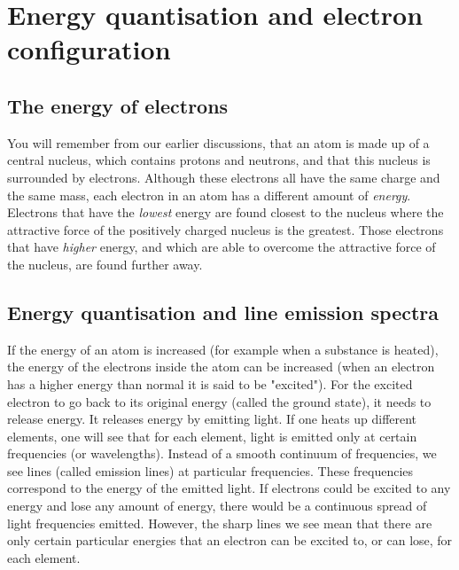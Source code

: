 



\section{Energy quantisation and electron configuration}
\label{sec:atom:energy}

\subsection{The energy of electrons}

You will remember from our earlier discussions, that an atom is made up of a central nucleus, which contains protons and neutrons, and that this nucleus is surrounded by electrons. Although these electrons all have the same charge and the same mass, each electron in an atom has a different amount of \textit{energy}. Electrons that have the \textit{lowest} energy are found closest to the nucleus where the attractive force of the positively charged nucleus is the greatest. Those electrons that have \textit{higher} energy, and which are able to overcome the attractive force of the nucleus, are found further away. 

\subsection{Energy quantisation and line emission spectra}

If the energy of an atom is increased (for example when a substance is heated), the energy of the electrons inside the atom can be increased (when an electron has a higher energy than normal it is said to be "excited"). For the excited electron to go back to its original energy (called the ground state), it needs to release energy. It releases energy by emitting light.
If one heats up different elements, one will see that for each element, light is emitted only at certain frequencies (or wavelengths). Instead of a smooth continuum of frequencies, we see lines (called emission lines) at particular frequencies. These frequencies correspond to the energy of the emitted light. If electrons could be excited to any energy and lose any amount of energy, there would be a continuous spread of light frequencies emitted. However, the sharp lines we see mean that there are only certain particular energies that an electron can be excited to, or can lose, for each element.\\

